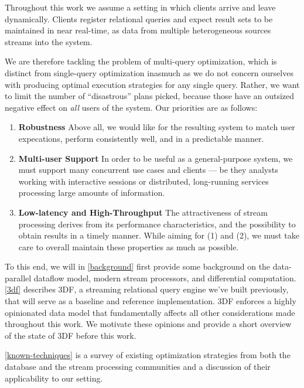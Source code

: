 \documentclass[../index.tex]{subfiles}
\begin{document}
Throughout this work we assume a setting in which clients arrive and
leave dynamically. Clients register relational queries and expect
result sets to be maintained in near real-time, as data from multiple
heterogeneous sources streams into the system.

We are therefore tackling the problem of multi-query optimization,
which is distinct from single-query optimization inasmuch as we do not
concern ourselves with producing optimal execution strategies for any
single query. Rather, we want to limit the number of ``disastrous''
plans picked, because those have an outsized negative effect on
\emph{all} users of the system. Our priorities are as follows:

\begin{enumerate}
  \item \textbf{Robustness} Above all, we would like for the resulting
    system to match user expecations, perform consistently well, and
    in a predictable manner.

  \item \textbf{Multi-user Support} In order to be useful as a
    general-purpose system, we must support many concurrent use cases
    and clients — be they analysts working with interactive sessions
    or distributed, long-running services processing large amounts of
    information.

  \item \textbf{Low-latency and High-Throughput} The attractiveness of
    stream processing derives from its performance characteristics,
    and the possibility to obtain results in a timely manner. While
    aiming for (1) and (2), we must take care to overall maintain
    these properties as much as possible.
\end{enumerate}

To this end, we will in \autoref{background} first provide some
background on the data-parallel dataflow model, modern stream
processors, and differential computation. \autoref{3df} describes 3DF,
a streaming relational query engine we've built previously, that will
serve as a baseline and reference implementation. 3DF enforces a
highly opinionated data model that fundamentally affects all other
considerations made throughout this work. We motivate these opinions
and provide a short overview of the state of 3DF before this work.

\autoref{known-techniques} is a survey of existing optimization
strategies from both the database and the stream processing
communities and a discussion of their applicability to our setting.
\end{document}
